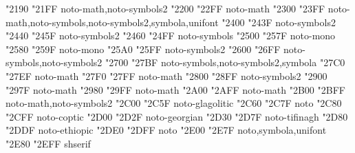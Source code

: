 \documentclass{article}
\begin{document}
                                             {  "2190} {  "21FF} {noto-math,noto-symbols2}
                             {  "2200} {  "22FF} {noto-math}
                            {  "2300} {  "23FF} {noto-math,noto-symbols,noto-symbols2,symbola,unifont}
                                   {  "2400} {  "243F} {noto-symbols2}
                      {  "2440} {  "245F} {noto-symbols2}
                             {  "2460} {  "24FF} {noto-symbols}
                                        {  "2500} {  "257F} {noto-mono}
                                     {  "2580} {  "259F} {noto-mono}
                                   {  "25A0} {  "25FF} {noto-symbols2}
                              {  "2600} {  "26FF} {noto-symbols,noto-symbols2}
                                           {  "2700} {  "27BF} {noto-symbols,noto-symbols2,symbola}
               {  "27C0} {  "27EF} {noto-math}
                              {  "27F0} {  "27FF} {noto-math}
                                   {  "2800} {  "28FF} {noto-symbols2}
                              {  "2900} {  "297F} {noto-math}
               {  "2980} {  "29FF} {noto-math}
                {  "2A00} {  "2AFF} {noto-math}
                   {  "2B00} {  "2BFF} {noto-math,noto-symbols2}
                                         {  "2C00} {  "2C5F} {noto-glagolitic}
                                   {  "2C60} {  "2C7F} {noto}
                                             {  "2C80} {  "2CFF} {noto-coptic}
                                {  "2D00} {  "2D2F} {noto-georgian}
                                           {  "2D30} {  "2D7F} {noto-tifinagh}
                                  {  "2D80} {  "2DDF} {noto-ethiopic}
                                {  "2DE0} {  "2DFF} {noto}
                           {  "2E00} {  "2E7F} {noto,symbola,unifont}
                            {  "2E80} {  "2EFF} {shserif}
\end{document}
